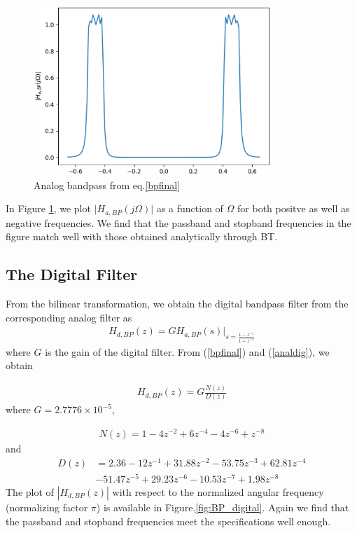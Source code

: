 \documentclass[journal,12pt,twocolumn]{IEEEtran}
\begin{document}
\begin{enumerate}
\begin{figure}
    \includegraphics[width=9cm]{./figs/iir/ee18btech11035_analog_bp.eps}
    \caption{Analog bandpass from eq.\ref{bpfinal}}
    \label{fig:Analog_BP}
\end{figure}
In Figure \ref{fig:Analog_BP}, we plot $\vert H_{a,BP}(j\Omega)\vert$ as a function of $\Omega$ for both positve as
well as negative frequencies.  We find that the passband and stopband frequencies in the figure
match well with those obtained analytically through BT.
\end{enumerate}

\subsection{The Digital Filter}
From the bilinear transformation, we obtain the digital bandpass filter from the corresponding analog filter as
\begin{eqnarray}
\label{analdig}
H_{d,BP}(z) = GH_{a,BP}(s)\vert_{s = \frac{1-z^{-1}}{1 + z^{-1}}}
\end{eqnarray}
where $G$ is the gain of the digital filter.  From (\ref{bpfinal}) and (\ref{analdig}), we obtain

\begin{eqnarray}
H_{d,BP}(z) = G \frac{N(z)}{D(z)}
\end{eqnarray}
where $G = 2.7776 \times 10^{-5}$,

\begin{eqnarray}
N(z) =  1 - 4 z^{-2} + 6 z^{-4} - 4z^{-6} + z^{-8} 
\end{eqnarray}
and
\begin{align}
D(z) &= 2.36 -12z^{-1} + 31.88z^{-2}  -53.75z^{-3} +  62.81z^{-4}\nonumber \\
  &-51.47z^{-5}+   29.23z^{-6}  -10.53z^{-7} +1.98z^{-8}
\end{align}
The plot of $|H_{d,BP}(z)|$ with respect to the normalized angular frequency (normalizing factor $\pi$) is available in Figure.\ref{fig:BP_digital}.  Again we
find that the passband and stopband frequencies meet the specifications well enough.
\end{document}
